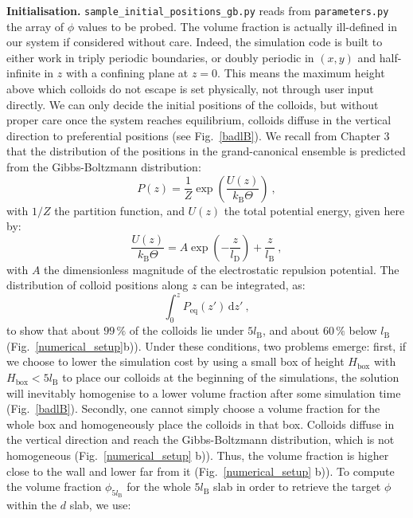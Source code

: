 \textbf{Initialisation.} \texttt{sample\_initial\_positions\_gb.py} reads from \texttt{parameters.py} the array of $\phi$ values to be probed. 
The volume fraction is actually ill-defined in our system if considered without care. Indeed, the simulation code is built to either work in triply periodic boundaries, or doubly periodic in $(x, y)$ and half-infinite in $z$ with a confining plane at $z=0$. This means the maximum height above which colloids do not escape is set physically, not through user input directly. We can only decide the initial positions of the colloids, but without proper care once the system reaches equilibrium, colloids diffuse in the vertical direction to preferential positions (see Fig.~\ref{badlB}). We recall from Chapter 3 that the distribution of the positions in the grand-canonical ensemble is predicted from the Gibbs-Boltzmann distribution:
\begin{equation}
    P(z) = \dfrac{1}{Z} \exp \left( \dfrac{U(z)}{k_\mathrm{B}\Theta} \right)~,
    \label{GBch4}
\end{equation}
with $1/Z$ the partition function, and $U(z)$ the total potential energy, given here by:
\begin{equation}
    \dfrac{U(z)}{k_\mathrm{B}\Theta} = A \exp\left(- \dfrac{z}{l_\mathrm{D}}\right) + \dfrac{z}{l_\mathrm{B}}~,
\end{equation}
with $A$ the dimensionless magnitude of the electrostatic repulsion potential. The distribution of colloid positions along $z$ can be integrated, as:
\begin{equation}
\int_{0}^{z} P_\mathrm{eq}(z')\, \mathrm dz'~,
\label{eq:cumsum}
\end{equation}
to show that about $99\,\%$ of the colloids lie under $5l_\mathrm{B}$, and about $60\,\%$ below $l_\mathrm{B}$ (Fig.~\ref{numerical_setup}b)). Under these conditions, two problems emerge: first, if we choose to lower the simulation cost by using a small box of height $H_\mathrm{box}$ with $H_\mathrm{box}<5l_\mathrm{B}$ to place our colloids at the beginning of the simulations, the solution will inevitably homogenise to a lower volume fraction after some simulation time (Fig.~\ref{badlB}). Secondly, one cannot simply choose a volume fraction for the whole box and homogeneously place the colloids in that box. Colloids diffuse in the vertical direction and reach the Gibbs-Boltzmann distribution, which is not homogeneous (Fig.~\ref{numerical_setup} b)). Thus, the volume fraction is higher close to the wall and lower far from it (Fig.~\ref{numerical_setup} b)). To compute the volume fraction $\phi_{5l_\mathrm{B}}$ for the whole $5l_\mathrm{B}$ slab in order to retrieve the target $\phi$ within the $d$ slab, we use:
